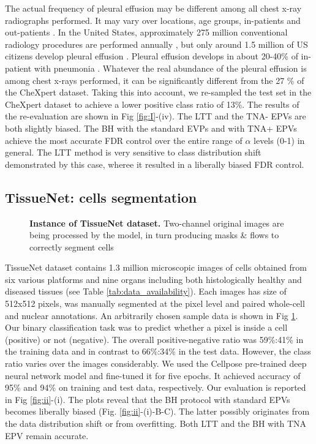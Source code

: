 \documentclass[10pt,letterpaper]{article}
\begin{document}
The actual frequency of pleural effusion may be different among all chest x-ray radiographs performed.
It may vary over locations, age groups, in-patients and out-patients \cite{Zaki2024,Cashen2017PleuralEA}.
In the United States, approximately 275 million conventional radiology procedures are performed annually \cite{mahesh2022patient}, but only around 1.5 million of US citizens develop pleural effusion \cite{Cashen2017PleuralEA}.
Pleural effusion develops in about 20-40\% of in-patient with pneumonia \cite{shebl2018parapneumonic}.
Whatever the real abundance of the pleural effusion is among  chest x-rays performed, it can be significantly different from the 27 \% of the CheXpert dataset.
Taking this into account, we re-sampled the test set in the CheXpert dataset to achieve a lower positive class ratio of 13\%.
The results of the re-evaluation are shown in Fig \ref{fig:I}-(iv).
The LTT and the TNA- EPVs are both slightly biased.
The BH with the standard EVPs and with TNA+ EPVs achieve the most accurate FDR control over the entire range of $\alpha$ levels (0-1) in general.
The LTT method is very sensitive to class distribution shift demonstrated by this case, wheree it resulted in a liberally biased FDR control.



\subsection*{TissueNet: cells segmentation}

\begin{figure}[h!]
    \centering
	\caption{{\bf Instance of TissueNet dataset.} Two-channel original images are being processed by the model, in turn producing masks \& flows to correctly segment cells}
	\label{fig:tissue_example}
\end{figure} 

TissueNet dataset contains 1.3 million microscopic images of cells obtained from six various platforms and nine organs including both histologically healthy and diseased tissues \cite{greenwald2022whole}(see Table \ref{tab:data_availability}).
Each images has size of 512x512 pixels, was manually segmented at the pixel level and paired whole-cell and nuclear annotations.
An arbitrarily chosen sample data is shown in Fig \ref{fig:tissue_example}.
Our binary classification task was to predict whether a pixel is inside a cell (positive) or not (negative).
The overall positive-negative ratio was 59\%:41\% in the training data and in contrast to 66\%:34\% in the test data.
However, the class ratio varies over the images considerably.
We used the Cellpose pre-trained deep neural network model \cite{cellpose} and fine-tuned it for five epochs.
It achieved accuracy of 95\% and 94\% on training and test data, respectively.
Our evaluation is reported in Fig \ref{fig:ii}-(i).
The plots reveal that the BH protocol with standard EPVs becomes liberally biased (Fig. \ref{fig:ii}-(i)-B-C).
The latter possibly originates from the data distribution shift or from overfitting.
Both LTT and the BH with TNA EPV remain accurate. 
\end{document}
